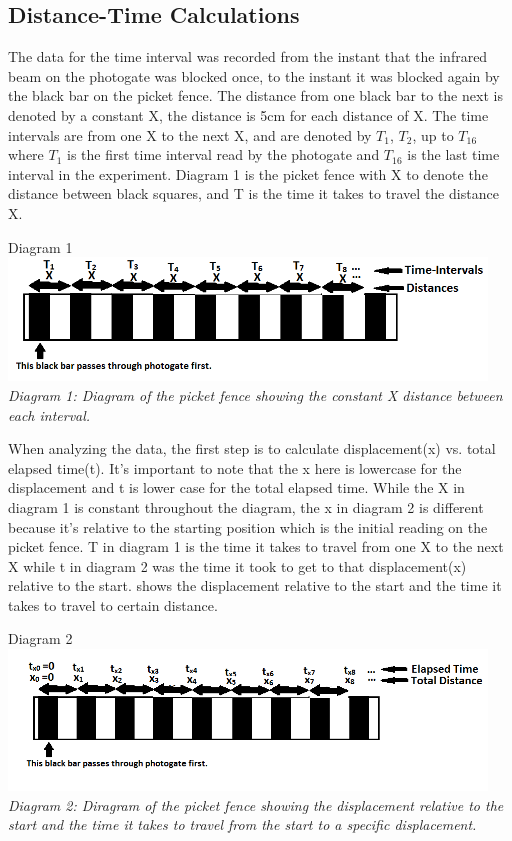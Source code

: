 \documentclass[aps,letterpaper,11pt]{revtex4}
\begin{document}
\subsection{Distance-Time Calculations}

The data for the time interval was recorded from the instant that the infrared beam on the photogate was blocked once, to the instant it was blocked again by the black bar on the picket fence. The distance from one black bar to the next is denoted by a constant X, the distance is 5cm for each distance of X. The time intervals are from one X to the next X, and are denoted by $T_1$, $T_2$, up to $T_{16}$ where $T_1$ is the first time interval read by the photogate and $T_{16}$ is the last time interval in the experiment. Diagram 1 is the picket fence with X to denote the distance between black squares, and T is the time it takes to travel the distance X. 

\begin{center}
Diagram 1\\
\includegraphics[width = 5in]{TimeIntervalPicketFence.png}\\
\textit{Diagram 1: Diagram of the picket fence showing the constant X distance between each interval.}
\end{center}     

When analyzing the data, the first step is to calculate displacement(x) vs. total elapsed time(t). It's important to note that the x here is lowercase for the displacement and t is lower case for the total elapsed time. While the X in diagram 1 is constant throughout the diagram, the x in diagram 2 is different because it's relative to the starting position which is the initial reading on the picket fence. T in diagram 1 is the time it takes to travel from one X to the next X while t in diagram 2 was the time it took to get to that displacement(x) relative to the start. shows the displacement relative to the start and the time it takes to travel to certain distance. 

\begin{center}
Diagram 2\\
\includegraphics[width = 5in]{ElapsedTimePicketFence.png}\\
\textit{Diagram 2: Diragram of the picket fence showing the displacement relative to the start and the time it takes to travel from the start to a specific displacement.}
\end{center} 
\end{document}
